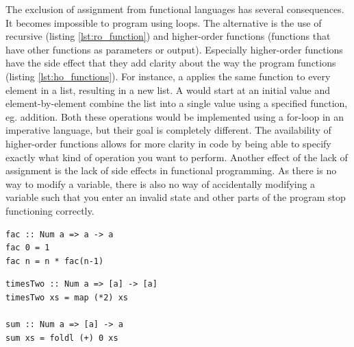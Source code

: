 The exclusion of assignment from functional languages has several consequences. It becomes impossible to program using loops. The alternative is the use of recursive (listing \ref{lst:ro_function}) and higher-order functions (functions that have other functions as parameters or output). Especially higher-order functions have the side effect that they add clarity about the way the program functions (listing \ref{lst:ho_functions}). For instance, a  applies the same function to every element in a list, resulting in a new list. A  would start at an initial value and element-by-element combine the list into a single value using a specified function, eg. addition. Both these operations would be implemented using a for-loop in an imperative language, but their goal is completely different. The availability of higher-order functions allows for more clarity in code by being able to specify exactly what kind of operation you want to perform. Another effect of the lack of assignment is the lack of side effects in functional programming. As there is no way to modify a variable, there is also no way of accidentally modifying a variable such that you enter an invalid state and other parts of the program stop functioning correctly.

\begin{lstlisting}[caption=Recursive functions, label=lst:rec_function]
fac :: Num a => a -> a
fac 0 = 1
fac n = n * fac(n-1)
\end{lstlisting}

\begin{lstlisting}[caption=Higher order functions, label=lst:ho_functions]
timesTwo :: Num a => [a] -> [a]
timesTwo xs = map (*2) xs

sum :: Num a => [a] -> a
sum xs = foldl (+) 0 xs
\end{lstlisting}

